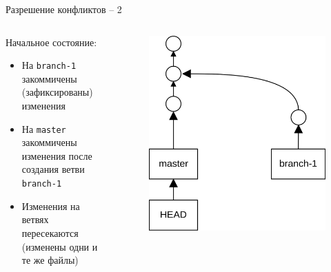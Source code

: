 \documentclass[presentation]{beamer}
\begin{document}
\begin{frame}[fragile]{Разрешение конфликтов -- 2}
  \begin{columns}
    \begin{column}{.6\textwidth}
      Начальное состояние:
      \begin{itemize}
      \item На \texttt{branch-1} закоммичены (зафиксированы) изменения
      \item На \texttt{master} закоммичены изменения после создания
        ветви \texttt{branch-1}
      \item Изменения на ветвях пересекаются (изменены одни и те же
        файлы)
      \end{itemize}
      \end{column}
      \begin{column}{.4\textwidth}
        \begin{figure}[htb]
          \centering
          \includegraphics[height=.6\textheight]{git-operation-merge-2-1}
        \end{figure}
      \end{column}
    \end{columns}
\end{frame}
\end{document}
